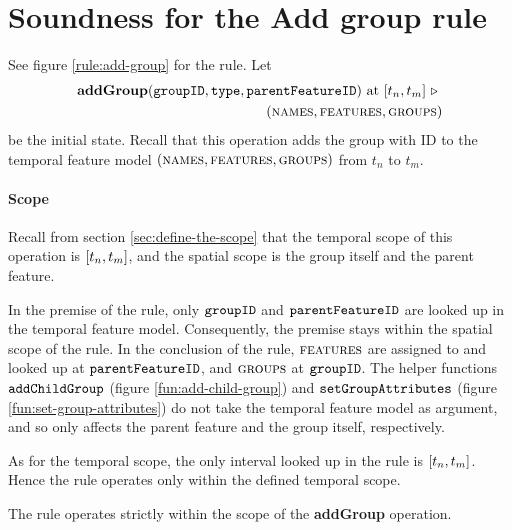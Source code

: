 
\section{Soundness for the Add group rule}
\label{sec:soundness-for-the-add-group-rule}

See figure \vref{rule:add-group} for the  rule. 
Let 
\begin{equation*}
   \begin{split}
      \textbf{addGroup}(\var{groupID}, \var{type}, \var{parentFeatureID})\text{ at }\interval{t_n}{t_m}
      \shove \\
   (\names{}, \features{}, \groups{})
\end{split}
\end{equation*}
be the initial state. Recall that this operation adds the group with ID  to the temporal feature model $(\textsc{names}{}, \textsc{features}{}, \textsc{groups}{}{})$ from $t_n$ to $t_m$. 

\paragraph{Scope}

Recall from section \vref{sec:define-the-scope} that the temporal scope of this operation is $\interval{t_n}{t_m}$, and the spatial scope is the group itself and the parent feature.

In the premise of the rule, only $\texttt{groupID}$ and $\texttt{parentFeatureID}$ are looked up in the temporal feature model. Consequently, the premise stays within the spatial scope of the rule. In the conclusion of the rule, $\textsc{features}{}$ are assigned to and looked up at $\texttt{parentFeatureID}$, and $\textsc{groups}{}{}$ at $\texttt{groupID}$. The helper functions $\texttt{addChildGroup}$ (figure \vref{fun:add-child-group}) and $\texttt{setGroupAttributes}$ (figure \vref{fun:set-group-attributes}) do not take the temporal feature model as argument, and so only affects the parent feature and the group itself, respectively.

As for the temporal scope, the only interval looked up in the rule is $\interval{t_n}{t_m}$. Hence the rule operates only within the defined temporal scope.
\\

\begin{lemma}
   The  rule operates strictly within the scope of the \textbf{addGroup} operation.
   \label{lemma:add-group-scope}
\end{lemma}

